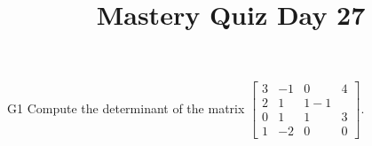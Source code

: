 \documentclass{sbgLAquiz}
\title{Mastery Quiz Day 27 }
\begin{document}
\begin{problem}{G1}
Compute the determinant of the matrix $\begin{bmatrix} 3 & -1 & 0 & 4 \\ 2 & 1 & 1 -1 \\ 0 & 1 & 1 & 3 \\ 1 & -2 & 0 & 0 \end{bmatrix}$.
\end{problem}
\end{document}
